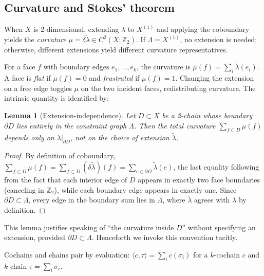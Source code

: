 \documentclass[11pt]{amsart}  %
\theoremstyle{plain}
\newtheorem{lemma}[theorem]{Lemma}
\theoremstyle{definition}
\theoremstyle{remark}
\newcommand{\style}[1]{{\em #1}} %
\newcommand{\coboundary}{\delta} %
\newcommand{\Z}{\mathbb{Z}} %
\newcommand{\cgraph}{\Lambda} %
\newcommand{\coupling}{\lambda} %
\begin{document}
\subsection{Curvature and Stokes' theorem}
\label{sec:curvature-stokes}

When $X$ is 2-dimensional, extending $\coupling$ to $X^{(1)}$ and applying the coboundary yields the \style{curvature} $\mu = \coboundary\tilde\coupling \in C^2(X; \Z_2)$. If $\cgraph = X^{(1)}$, no extension is needed; otherwise, different extensions yield different curvature representatives.

For a face $f$ with boundary edges $e_1, \ldots, e_k$, the curvature is $\mu(f) = \sum_i \tilde\coupling(e_i)$. A face is \style{flat} if $\mu(f) = 0$ and \style{frustrated} if $\mu(f) = 1$. Changing the extension on a free edge toggles $\mu$ on the two incident faces, redistributing curvature. The intrinsic quantity is identified by:


\begin{lemma}[Extension-independence]
\label{lem:extension-independence}
Let $D \subset X$ be a 2-chain whose boundary $\partial D$ lies entirely in the 
constraint graph $\cgraph$. Then the total curvature $\sum_{f \subset D} \mu(f)$ 
depends only on $\coupling|_{\partial D}$, not on the choice of extension 
$\tilde{\coupling}$.
\end{lemma}

\begin{proof}
By definition of coboundary, $\sum_{f \subset D} \mu(f) = \sum_{f \subset D} (\coboundary\tilde{\coupling})(f) = \sum_{e \in \partial D} \tilde{\coupling}(e)$, the last equality following from the fact that each interior edge of $D$ appears in exactly two face boundaries (canceling in $\Z_2$), while each boundary edge appears in exactly one. Since $\partial D \subset \cgraph$, every edge in the boundary sum lies in $\cgraph$, where $\tilde{\coupling}$ agrees with $\coupling$ by definition.
\end{proof}

This lemma justifies speaking of ``the curvature inside $D$'' without specifying 
an extension, provided $\partial D \subset \cgraph$. Henceforth we invoke this 
convention tacitly.

Cochains and chains pair by evaluation: $\langle c, \tau \rangle = \sum_i c(\sigma_i)$ for a $k$-cochain $c$ and $k$-chain $\tau = \sum_i \sigma_i$.
\end{document}
